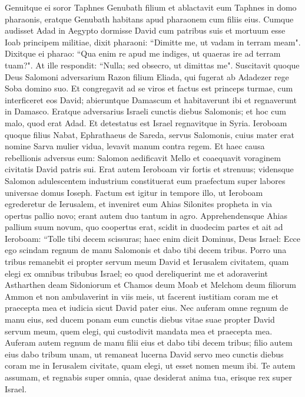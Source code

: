 \begin{biblechapter}
\verse Genuitque ei soror Taphnes Genubath filium et ablactavit eum Taphnes in domo pharaonis, eratque Genubath habitans apud pharaonem cum filiis eius. 
\verse Cumque audisset Adad in Aegypto dormisse David cum patribus suis et mortuum esse Ioab principem militiae, dixit pharaoni: “Dimitte me, ut vadam in terram meam". 
\verse Dixitque ei pharao: “Qua enim re apud me indiges, ut quaeras ire ad terram tuam?". At ille respondit: “Nulla; sed obsecro, ut dimittas me". 
\verse Suscitavit quoque Deus Salomoni adversarium Razon filium Eliada, qui fugerat ab Adadezer rege Soba domino suo. 
\verse Et congregavit ad se viros et factus est princeps turmae, cum interficeret eos David; abieruntque Damascum et habitaverunt ibi et regnaverunt in Damasco. 
\verse Eratque adversarius Israeli cunctis diebus Salomonis; et hoc cum malo, quod erat Adad. Et detestatus est Israel regnavitque in Syria. 
\verse Ieroboam quoque filius Nabat, Ephrathaeus de Sareda, servus Salomonis, cuius mater erat nomine Sarva mulier vidua, levavit manum contra regem. 
\verse Et haec causa rebellionis adversus eum: Salomon aedificavit Mello et coaequavit voraginem civitatis David patris sui. 
\verse Erat autem Ieroboam vir fortis et strenuus; vidensque Salomon adulescentem industrium constituerat eum praefectum super labores universae domus Ioseph. 
\verse Factum est igitur in tempore illo, ut Ieroboam egrederetur de Ierusalem, et inveniret eum Ahias Silonites propheta in via opertus pallio novo; erant autem duo tantum in agro. 
\verse Apprehendensque Ahias pallium suum novum, quo coopertus erat, scidit in duodecim partes 
\verse et ait ad Ieroboam: “Tolle tibi decem scissuras; haec enim dicit Dominus, Deus Israel: Ecce ego scindam regnum de manu Salomonis et dabo tibi decem tribus. 
\verse Porro una tribus remanebit ei propter servum meum David et Ierusalem civitatem, quam elegi ex omnibus tribubus Israel; 
\verse eo quod dereliquerint me et adoraverint Astharthen deam Sidoniorum et Chamos deum Moab et Melchom deum filiorum Ammon et non ambulaverint in viis meis, ut facerent iustitiam coram me et praecepta mea et iudicia sicut David pater eius. 
\verse Nec auferam omne regnum de manu eius, sed ducem ponam eum cunctis diebus vitae suae propter David servum meum, quem elegi, qui custodivit mandata mea et praecepta mea. 
\verse Auferam autem regnum de manu filii eius et dabo tibi decem tribus; 
\verse filio autem eius dabo tribum unam, ut remaneat lucerna David servo meo cunctis diebus coram me in Ierusalem civitate, quam elegi, ut esset nomen meum ibi. 
\verse Te autem assumam, et regnabis super omnia, quae desiderat anima tua, erisque rex super Israel. 

\end{biblechapter}
